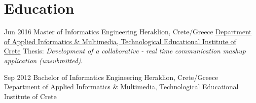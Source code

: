 \vspace{-0.08cm}
\section{\normalfont Education}
\vspace{-0.1cm}
\begin{entrylist}
\entry
{Jun 2016}
{Master {\normalfont of Informatics Engineering}}
{Heraklion, Crete/Greece}
{\href{https://www.teicrete.gr/}{Department of Applied Informatics \& Multimedia, Technological Educational Institute of Crete}}
Thesis: \emph{Development of a collaborative - real time communication mashup application (unsubmitted)}.\\
\vspace{-.4cm}

\entry
{Sep 2012}
{Bachelor {\normalfont of Informatics Engineering}}
{Heraklion, Crete/Greece}
Department of Applied Informatics \& Multimedia, Technological Educational Institute of Crete
\end{entrylist}

\vspace{-.08cm}
